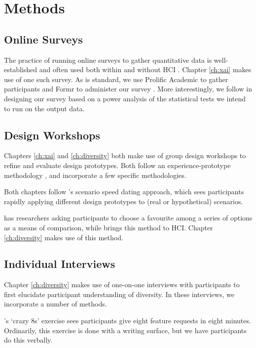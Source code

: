 \section{Methods} %
\subsection{Online Surveys}
The practice of running online surveys to gather quantitative data is well-established and often used both within and without HCI \cite{zhao2023fairness,pillai_adoption_2020,krishna_disagreement_2022,mai_user_nodate,bansal_does_2021,binns_its_2018,dzindolet_role_2003,papenmeier_its_2022}. Chapter \ref{ch:xai} makes use of one such survey. As is standard, we use Prolific Academic to gather participants and Formr to administer our survey \cite{binns_its_2018,Arslan_formr_2019}. More interestingly, we follow \textcite{caldwell_power_nodate} in designing our survey based on a power analysis of the statistical tests we intend to run on the output data.

\subsection{Design Workshops}
Chapters \ref{ch:xai} and \ref{ch:diversity} both make use of group design workshops to refine and evaluate design prototypes. Both follow an experience-prototype methodology \cite{Buchenau_Suri_2000}, and incorporate a few specific methodologies.

Both chapters follow \textcite{Zimmerman_Forlizzi_2017}'s scenario speed dating approach, which sees participants rapidly applying different design prototypes to (real or hypothetical) scenarios.

\textcite{Gatian_1994} has researchers asking participants to choose a favourite among a series of options as a means of comparison, while \textcite{Griffiths_Johnson_Hartley_2007} brings this method to HCI. Chapter \ref{ch:diversity} makes use of this method.

\subsection{Individual Interviews}
Chapter \ref{ch:diversity} makes use of one-on-one interviews with participants to first elucidate participant understanding of diversity. In these interviews, we incorporate a number of methods.

\textcite{Knapp_Zeratzky_Kowitz_2016}'s `crazy 8s' exercise sees participants give eight feature requests in eight minutes. Ordinarily, this exercise is done with a writing surface, but we have participants do this verbally.

